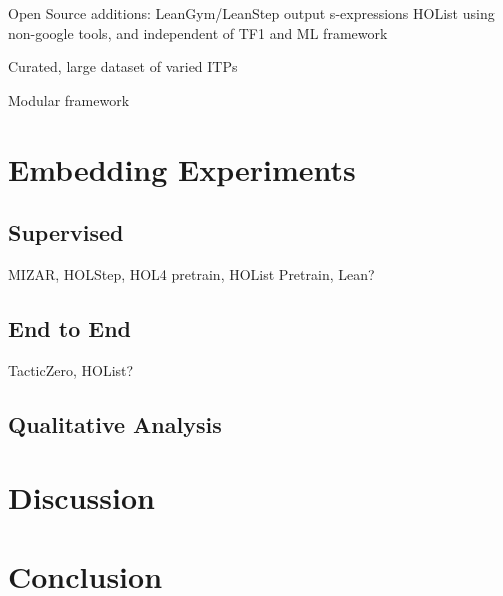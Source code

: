 \documentclass[letterpaper]{article} %
\begin{document}
    Open Source additions:
    LeanGym/LeanStep output s-expressions
    HOList using non-google tools, and independent of TF1 and ML framework

    Curated, large dataset of varied ITPs

    Modular framework


    \section{Embedding Experiments}

    \subsection{Supervised}
    MIZAR, HOLStep, HOL4 pretrain, HOList Pretrain, Lean?

    \subsection{End to End}
    TacticZero, HOList?

    \subsection{Qualitative Analysis}


    \section{Discussion}


    \section{Conclusion}
\end{document}
